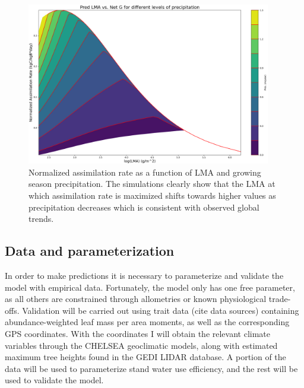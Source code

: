 \begin{figure}[h!]
    \centering
    \includegraphics[width=0.95\textwidth]{figures/SLA_G_Pinc.png} 
    \caption{Normalized assimilation rate as a function of LMA and growing season precipitation. The simulations clearly show that the LMA at which assimilation rate is maximized shifts towards higher values as precipitation decreases which is consistent with observed global trends.}
    \label{fig:SLA_G_Pinc}
\end{figure} 

\subsection{Data and parameterization}
 
In order to make predictions it is necessary to parameterize and validate the model with empirical data. Fortunately, the model only has one free parameter, as all others are constrained through allometries or known physiological trade-offs. Validation will be carried out using trait data (cite data sources) containing abundance-weighted leaf mass per area moments, as well as the corresponding GPS coordinates. With the coordinates I will obtain the relevant climate variables through the CHELSEA geoclimatic models, along with estimated maximum tree heights found in the GEDI LIDAR database. A portion of the data will be used to parameterize stand water use efficiency, and the rest will be used to validate the model. 







